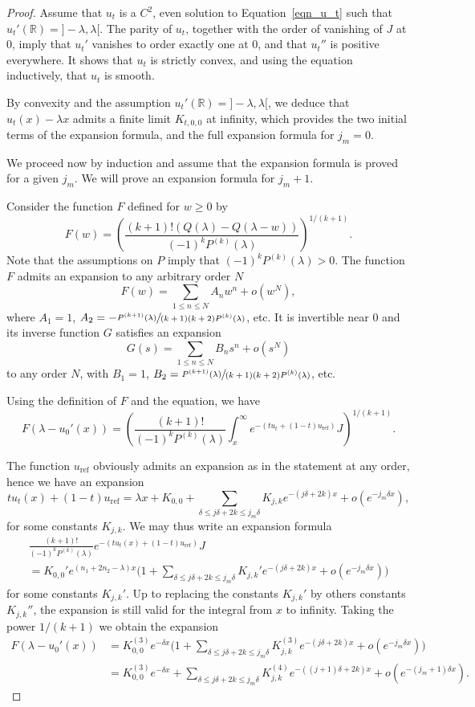 \documentclass[10pt]{amsart}
\theoremstyle{plain}
\theoremstyle{definition}
\begin{document}
\begin{proof}
Assume that $u_t$ is a $C^2$, even solution to Equation~\eqref{eqn_u_t}
such that $u_t'(\mathbb{R})={}]-\lambda,\lambda[$. The parity of $u_t$, together
with the order of vanishing of $J$ at $0$, imply that $u_t'$ vanishes to order
exactly one at $0$, and that $u_t''$ is positive everywhere. It shows that $u_t$
is strictly convex, and using the equation inductively, that $u_t$ is smooth.

By convexity and the assumption $u_t'(\mathbb{R})={}]-\lambda,\lambda[$, we deduce
that $u_t(x)-\lambda x$ admits a finite limit $K_{t,0,0}$ at infinity, which
provides the two initial terms of the expansion formula, and the full expansion
formula for $j_m=0$.

We proceed now by induction and assume that the expansion formula is proved
for a given $j_m$. We will prove an expansion formula for
$j_m+1$.

Consider the function $F$ defined for $w\geq 0$ by
\[ F(w)=\left( \frac{(k+1)!(Q(\lambda)-Q(\lambda-w))}{(-1)^kP^{(k)}(\lambda)} \right)^{1/(k+1)}. \]
Note that the assumptions on $P$ imply that $(-1)^kP^{(k)}(\lambda)>0$.
The function $F$ admits an expansion to any arbitrary order $N$
\[ F(w)= \sum_{1\leq n\leq N}A_nw^n +o(w^N), \]
where $A_1=1$, $A_2=-\sfrac{P^{(k+1)}(\lambda)}{(k+1)(k+2)P^{(k)}(\lambda)}$, etc.
It is invertible near $0$ and its inverse function $G$ satisfies an expansion
\[ G(s)= \sum_{1\leq n\leq N}B_ns^n +o(s^N) \]
to any order $N$, with $B_1=1$,
$B_2=\sfrac{P^{(k+1)}(\lambda)}{(k+1)(k+2)P^{(k)}(\lambda)}$, etc.

Using the definition of $F$ and the equation, we have
\[ F(\lambda-u_0'(x)) =
\left(\frac{(k+1)!}{(-1)^kP^{(k)}(\lambda)}
\int_x^{\infty}e^{-(tu_t+(1-t)u_{\mathrm{ref}})}J\right)^{1/(k+1)}. \]

The function $u_{\mathrm{ref}}$ obviously admits an expansion as in the
statement at any order, hence we have an expansion
\[ tu_t(x)+(1-t)u_{\mathrm{ref}}= \lambda x +K_{0,0}+
\sum_{\delta\leq j\delta+2k\leq j_m\delta}K_{j,k}e^{-(j\delta+2k)x}
+o(e^{-j_m\delta x}), \]
for some constants $K_{j,k}$.
We may thus write an expansion formula
\begin{multline*}
\frac{(k+1)!}{(-1)^kP^{(k)}(\lambda)}e^{-(tu_t(x)+(1-t)u_{\mathrm{ref}})}J \\
= K_{0,0}'e^{(n_1+2n_2-\lambda)x} \biggl( 1+
\sum_{\delta\leq j\delta+2k\leq j_m\delta}K_{j,k}'e^{-(j\delta+2k)x}
+o(e^{-j_m \delta x}) \biggr)
\end{multline*}
for some constants $K_{j,k}'$. Up to replacing the constants $K_{j,k}'$
by others constants $K_{j,k}''$, the expansion is still valid for the integral
from $x$ to infinity.
Taking the power $1/(k+1)$ we obtain the expansion
\begin{align*}
F(\lambda-u_0'(x)) & = K_{0,0}^{(3)}e^{-\delta x} \biggl( 1 +
\sum_{\delta\leq j\delta+2k\leq j_m\delta}K_{j,k}^{(3)}e^{-(j\delta+2k)x}
+o(e^{-j_m \delta x}) \biggr)
\\
&
= K_{0,0}^{(3)}e^{-\delta x} +
\sum_{\delta\leq j\delta+2k\leq j_m\delta}K_{j,k}^{(4)}e^{-((j+1)\delta+2k)x}
+o(e^{-(j_m+1)\delta x}).
\end{align*}


\end{proof}
\end{document}
